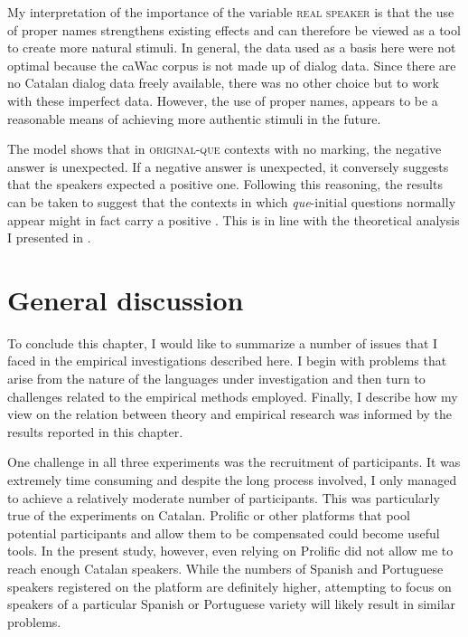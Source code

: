 My interpretation of the  importance of the variable \textsc{real speaker} is that the use of proper names strengthens existing effects and can therefore be viewed as a tool to create more natural stimuli. In general, the data used as a basis here were not optimal because the caWac corpus is not made up of  dialog data. Since there are no Catalan dialog data freely available, there was no other choice but to work with these imperfect data. However, the use of proper names, appears to be a reasonable  means of achieving  more authentic stimuli in the future.


The  model shows that in \textsc{original-que} contexts with no  marking, the negative answer is unexpected. If a negative answer is unexpected, it conversely  suggests that the speakers expected  a positive one. Following this reasoning, the results can be taken to suggest that the contexts in which \emph{que}-initial questions normally appear might in fact carry a positive . This is  in line with the theoretical analysis I presented in .

\section{General discussion}\label{sec:empgeneraldiss}

To conclude this chapter, I would like to summarize a number of issues that I faced in the empirical investigations described here. I begin with problems that arise from the nature of the languages under investigation and then turn to challenges related to the empirical methods employed. Finally, I describe how my view on the relation between theory and empirical research was informed by the results reported in this chapter.

One  challenge in all three experiments was the recruitment of participants. It was extremely time consuming and despite the long process involved, I only managed to achieve a relatively moderate number of participants. This was particularly true of the experiments on Catalan. Prolific or other platforms that pool potential participants and allow them to be compensated  could become  useful tools. In the present study, however,  even relying on Prolific did not allow me to reach enough  Catalan speakers. While the numbers of Spanish and Portuguese speakers registered on the platform are definitely higher,  attempting to focus on  speakers of a particular Spanish or Portuguese variety will likely result in similar problems.

